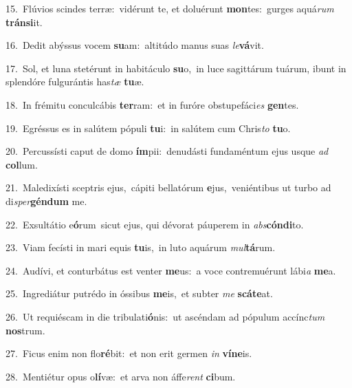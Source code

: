 {\numbfont\textcolor{\numbcolor}{15.}}~Flúvios scindes terræ:~\dagger vidérunt te, et doluérunt \textbf{mon}\-tes:~\star gurges aquá\textit{rum} \textbf{tráns}\-\textbf{i}it.\par
{\numbfont\textcolor{\numbcolor}{16.}}~Dedit abýssus vocem \textbf{su}\-am:~\star altitúdo manus suas \textit{le}\-\textbf{vá}vit.\par
{\numbfont\textcolor{\numbcolor}{17.}}~Sol, et luna stetérunt in habitáculo \textbf{su}\-o,~\star in luce sagittárum tuárum, ibunt in splendóre fulgurántis has\textit{tæ} \textbf{tu}\-æ.\par
{\numbfont\textcolor{\numbcolor}{18.}}~In frémitu conculcábis \textbf{ter}\-ram:~\star et in furóre obstupefáci\textit{es} \textbf{gen}\-tes.\par
{\numbfont\textcolor{\numbcolor}{19.}}~Egréssus es in salútem pópuli \textbf{tu}\-i:~\star in salútem cum Chris\textit{to} \textbf{tu}\-o.\par
{\numbfont\textcolor{\numbcolor}{20.}}~Percussísti caput de domo \textbf{ím}\-pii:~\star denudásti fundaméntum ejus usque \textit{ad} \textbf{col}\-lum.\par
{\numbfont\textcolor{\numbcolor}{21.}}~Maledixísti sceptris ejus,~\dagger cápiti bellatórum \textbf{e}\-jus,~\star veniéntibus ut turbo ad di\-\textit{sper}\-\textbf{gén}\textbf{dum} me.\par
{\numbfont\textcolor{\numbcolor}{22.}}~Exsultátio e\-\textbf{ó}\-rum~\star sicut ejus, qui dévorat páuperem in \textit{abs}\-\textbf{cón}\textbf{di}to.\par
{\numbfont\textcolor{\numbcolor}{23.}}~Viam fecísti in mari equis \textbf{tu}\-is,~\star in luto aquárum \textit{mul}\-\textbf{tá}rum.\par
{\numbfont\textcolor{\numbcolor}{24.}}~Audívi, et conturbátus est venter \textbf{me}\-us:~\star a voce contremuérunt lábi\textit{a} \textbf{me}\-a.\par
{\numbfont\textcolor{\numbcolor}{25.}}~Ingrediátur putrédo in óssibus \textbf{me}\-is,~\star et subter \textit{me} \textbf{scá}\-\textbf{te}at.\par
{\numbfont\textcolor{\numbcolor}{26.}}~Ut requiéscam in die tribulati\-\textbf{ó}\-nis:~\star ut ascéndam ad pópulum accínc\textit{tum} \textbf{nos}\-trum.\par
{\numbfont\textcolor{\numbcolor}{27.}}~Ficus enim non flo\-\textbf{ré}\-bit:~\star et non erit germen \textit{in} \textbf{ví}\-\textbf{ne}is.\par
{\numbfont\textcolor{\numbcolor}{28.}}~Mentiétur opus o\-\textbf{lí}\-væ:~\star et arva non áffe\textit{rent} \textbf{ci}\-bum.\par
